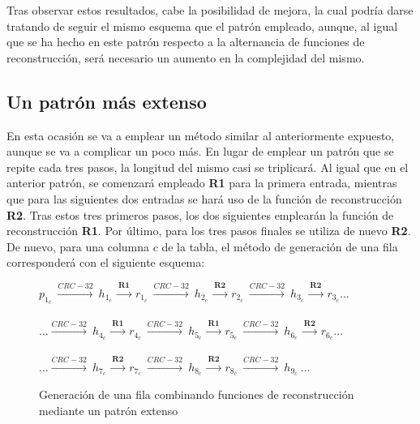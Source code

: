 \documentclass[12pt,spanish,listoffigures,listoftables,listofalgorithms]{tfgetsinf}
\begin{document}
Tras observar estos resultados, cabe la posibilidad de mejora, la cual podría darse tratando de seguir el mismo esquema que el patrón empleado, aunque, al igual que se ha hecho en este patrón respecto a la alternancia de funciones de reconstrucción, será necesario un aumento en la complejidad del mismo.

\subsection{Un patrón más extenso}

En esta ocasión se va a emplear un método similar al anteriormente expuesto, aunque se va a complicar un poco más. En lugar de emplear un patrón que se repite cada tres pasos, la longitud del mismo casi se triplicará. Al igual que en el anterior patrón, se comenzará empleado \textbf{R1} para la primera entrada, mientras que para las siguientes dos entradas se hará uso de la función de reconstrucción \textbf{R2}. Tras estos tres primeros pasos, los dos siguientes emplearán la función de reconstrucción \textbf{R1}. Por último, para los tres pasos finales se utiliza de nuevo \textbf{R2}. De nuevo, para una columna $c$ de la tabla, el método de generación de una fila corresponderá con el siguiente esquema:

\begin{figure}[H]
	
	\centering

	$p_{1_c}~ \xrightarrow{CRC-32}~ h_{1_c}~ \xrightarrow{\textbf{R1}}~ r_{1_c}~ \xrightarrow{CRC-32}~ h_{2_c}~ \xrightarrow{\textbf{R2}}~ r_{2_c}~ \xrightarrow{CRC-32}~ h_{3_c}~ \xrightarrow{\textbf{R2}}~ r_{3_c} \dots$ \\
	~\\
	$\dots \xrightarrow{CRC-32}~ h_{4_c}~ \xrightarrow{\textbf{R1}}~ r_{4_c}~ \xrightarrow{CRC-32}~ h_{5_c}~ \xrightarrow{\textbf{R1}}~ r_{5_c}~ \xrightarrow{CRC-32}~ h_{6_c}~ \xrightarrow{\textbf{R2}}~ r_{6_c} \dots$ \\
	~\\
	$\dots \xrightarrow{CRC-32}~ h_{7_c}~ \xrightarrow{\textbf{R2}}~ r_{7_c}~ \xrightarrow{CRC-32}~ h_{8_c}~ \xrightarrow{\textbf{R2}}~ r_{8_c}~ \xrightarrow{CRC-32}~ h_{9_c}~ \dots$\;\;\;\; \\

	\caption{Generación de una fila combinando funciones de reconstrucción mediante un patrón extenso}
	\label{filaPG}

\end{figure}
\end{document}
